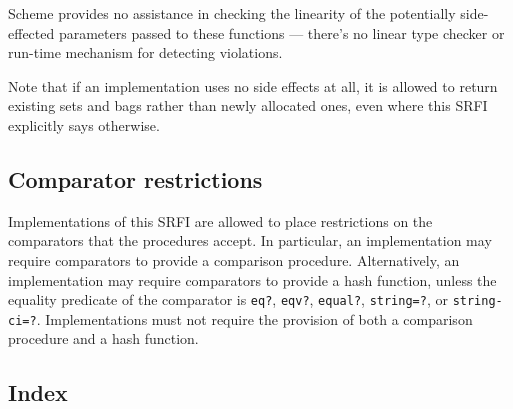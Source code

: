 Scheme provides no assistance in checking the linearity of the
potentially side-effected parameters passed to these functions ---
there's no linear type checker or run-time mechanism for detecting
violations.

Note that if an implementation uses no side effects at all, it is
allowed to return existing sets and bags rather than newly allocated
ones, even where this SRFI explicitly says otherwise.

\subsection{Comparator restrictions}\label{comparator-restrictions}

Implementations of this SRFI are allowed to place restrictions on the
comparators that the procedures accept. In particular, an implementation
may require comparators to provide a comparison procedure.
Alternatively, an implementation may require comparators to provide a
hash function, unless the equality predicate of the comparator is
\texttt{eq?}, \texttt{eqv?}, \texttt{equal?}, \texttt{string=?}, or
\texttt{string-ci=?}. Implementations must not require the provision of
both a comparison procedure and a hash function.

\subsection{Index}\label{Index}

